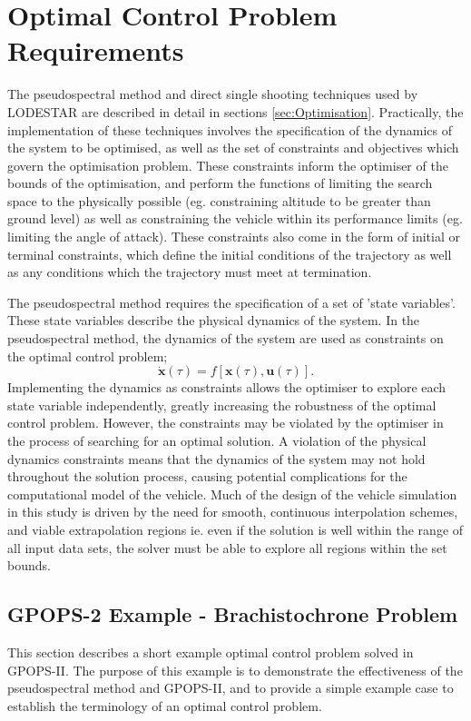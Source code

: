 \section{Optimal Control Problem Requirements}
The pseudospectral method and direct single shooting techniques used by LODESTAR are described in detail in sections \ref{sec:Optimisation}. Practically, the implementation of these techniques involves the specification of the dynamics of the system to be optimised, as well as the set of constraints and objectives which govern the optimisation problem. These constraints inform the optimiser of the bounds of the optimisation, and perform the functions of limiting the search space to the physically possible (eg. constraining altitude to be greater than ground level) as well as constraining the vehicle within its performance limits (eg. limiting the angle of attack). These constraints also come in the form of initial or terminal constraints, which define the initial conditions of the trajectory as well as any conditions which the trajectory must meet at termination. 

The pseudospectral method requires the specification of a set of 'state variables'. These state variables describe the physical dynamics of the system. In the pseudospectral method, the dynamics of the system are used as constraints on the optimal control problem;
\begin{equation} \label{eq:state2}
\dot{\textbf{x}}(\tau) = f[\textbf{x}(\tau),\textbf{u}(\tau)].
\end{equation}
Implementing the dynamics as constraints allows the optimiser to explore each state variable independently, greatly increasing the robustness of the optimal control problem. However, the constraints may be violated by the optimiser in the process of searching for an optimal solution. A violation of the physical dynamics constraints means that the dynamics of the system may not hold throughout the solution process, causing potential complications for the computational model of the vehicle. Much of the design of the vehicle simulation in this study is driven by the need for smooth, continuous interpolation schemes, and viable extrapolation regions ie. even if the solution is well within the range of all input data sets, the solver must be able to explore all regions within the set bounds. 

\subsection{GPOPS-2 Example - Brachistochrone Problem}
This section describes a short example optimal control problem solved in GPOPS-II. The purpose of this example is to demonstrate the effectiveness of the pseudospectral method and GPOPS-II, and to provide a simple example case to establish the terminology of an optimal control problem.  


